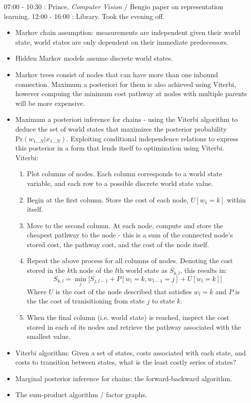 \documentclass[idxtotoc,hyperref,openany]{labbook} %
\begin{document}
07:00 - 10:30 : Prince, \emph{Computer Vision} / Bengio paper on representation learning.
12:00 - 16:00 : Library.
Took the evening off.

\begin{itemize}
	\item Markov chain assumption: measurements are independent given their world state, world states are only dependent on their immediate predecessors.
	\item Hidden Markov models assume discrete world states.
	\item Markov trees consist of nodes that can have more than one inbound connection. Maximum a posteriori for them is also achieved using Viterbi, however compuing the minimum cost pathway at nodes with multiple parents will be more expensive.
	\item Maximum a posteriori inference for chains - using the Viterbi algorithm to deduce the set of world states that maximizes the posterior probability $\text{Pr}(w_{1...N}|x_{1...N})$. Exploiting conditional independence relations to express this posterior in a form that lends itself to optimization using Viterbi. Viterbi:
	\begin{enumerate}
		\item Plot columns of nodes. Each column corresponds to a world state variable, and each row to a possible discrete world state value.
		\item Begin at the first column. Store the cost of each node, $U[w_1 = k]$ within itself.
		\item Move to the second column. At each node, compute and store the cheapest pathway to the node - this is a sum of the connected node's stored cost, the pathway cost, and the cost of the node itself. 
		\item Repeat the above process for all columns of nodes. Denoting the cost stored in the $k$th node of the $l$th world state as $S_{k, l}$, this results in:
		\[
			S_{k, l} = \min_{j}\Big[  S_{j, l - 1} + P[w_l = k, w_{l-1} = j] + U[w_l = k] \Big]
		\]
		Where $U$ is the cost of the node described that satisfies $w_l = k$ and $P$ is the the cost of tranisitioning from state $j$ to state $k$.
		\item When the final column (i.e. world state) is reached, inspect the cost stored in each of its nodes and retrieve the pathway associated with the smallest value.
	\end{enumerate}
	\item Viterbi algorithm: Given a set of states, costs associated with each state, and costs to transition between states, what is the least costly series of states?
	\item Marginal posterior inference for chains: the forward-backward algorithm. 
	\item The sum-product algorithm / factor graphs.
\end{itemize}
\end{document}
